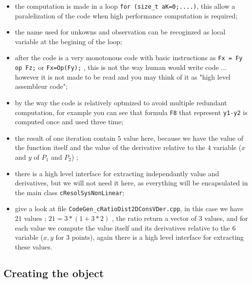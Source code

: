 \begin{itemize}
  \item  the computation is made in a loop {\tt for (size\_t aK=0;....)}, this 
         allow a paralelization of the code when high performance computation is
         required;

  \item  the name used for unkowns and observation can be recoginzed as local
         variable at the begining of the loop;

  \item  after the code is a very monotonous code with basic instructions as
         {\tt Fx = Fy op Fz;}  or {\tt Fx=Op(Fy);}  ,  this is not the way
         human would write code ...  however it is not made to be read and you may
         think of it as "high level assembleur code";

  \item  by the way the code is relatively optmized to avoid multiple redundant computation,
         for example you can see that formula {\tt F8}  that represent {\tt y1-y2} is computed
         once and used three time;

  \item  the result of one iteration contain $5$ value here, because we have the value of the function
         itself and the value of the derivative relative to the $4$ variable ($x$ and $y$ of
         $P_1$ and $P_2$) ;  

  \item  there is a high level interface for extracting independantly value and derivatives,
         but we will not need it here, as everything will be encapsulated in the main 
         class {\tt cResolSysNonLinear};

  \item  give a look at file {\tt CodeGen\_cRatioDist2DConsVDer.cpp}, in this case we have $21$
         values ; $21 = 3 * (1 + 3*2)$ , the ratio return a vector of $3$ values, and
         for each value we compute the value itself and its derivatives relative to the $6$
         variable ($x,y$ for $3$ points), again there is a high level interface for extracting
         these values.
\end{itemize}


\subsection{Creating the object}

